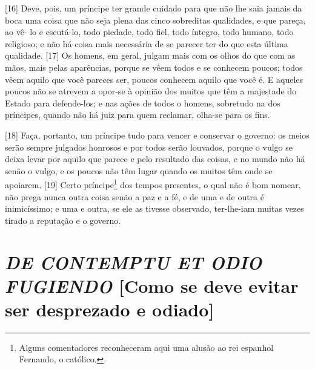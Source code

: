 {[}16{]} Deve, pois, um príncipe ter grande cuidado para que não lhe
saia jamais da boca uma coisa que não seja plena das cinco sobreditas
qualidades, e que pareça, ao vê- lo e escutá-lo, todo piedade, todo
fiel, todo íntegro, todo humano, todo religioso; e não há coisa mais
necessária de se parecer ter do que esta última qualidade. {[}17{]} Os
homens, em geral, julgam mais com os olhos do que com as mãos, mais
pelas aparências, porque se vêem todos e se conhecem poucos; todos vêem
aquilo que você pareces ser, poucos conhecem aquilo que você é. E
aqueles poucos não se atrevem a opor-se à opinião dos muitos que têm a
majestade do Estado para defende-los; e nas ações de todos o homens,
sobretudo na dos príncipes, quando não há juiz para quem reclamar,
olha-se para os fins.

{[}18{]} Faça, portanto, um príncipe tudo para vencer e conservar o
governo: os meios serão sempre julgados honrosos e por todos serão
louvados, porque o vulgo se deixa levar por aquilo que parece e pelo
resultado das coisas, e no mundo não há senão o vulgo, e os poucos não
têm lugar quando os muitos têm onde se apoiarem. {[}19{]} Certo
príncipe\footnote{Alguns comentadores reconheceram aqui uma alusão ao
  rei espanhol Fernando, o católico.} dos tempos presentes, o qual não é
bom nomear, não prega nunca outra coisa senão a paz e a fé, e de uma e
de outra é inimicíssimo; e uma e outra, se ele as tivesse observado,
ter-lhe-iam muitas vezes tirado a reputação e o governo.

\quebra\section{\emph{DE CONTEMPTU ET ODIO FUGIENDO}
{[}Como se deve evitar ser desprezado e odiado{]}}

